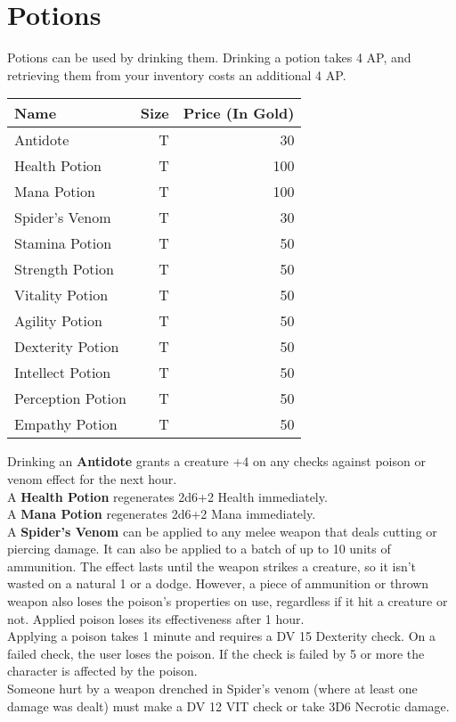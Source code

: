 \section{Potions}
Potions can be used by drinking them. Drinking a potion takes 4 AP, and retrieving them from your inventory costs an additional 4 AP.

\begin{longtable}{l | r | r}
	Name & Size & Price (In Gold)\\ \hline
	Antidote & T & 30\\
	Health Potion & T & 100\\
	Mana Potion & T & 100\\
	Spider's Venom & T & 30\\
	Stamina Potion & T & 50\\
	Strength Potion & T & 50\\
	Vitality Potion & T & 50\\
	Agility Potion & T & 50\\
	Dexterity Potion & T & 50\\
	Intellect Potion & T & 50\\
	Perception Potion & T & 50\\
	Empathy Potion & T & 50\\
\end{longtable}


Drinking an \textbf{Antidote} grants a creature +4 on any checks against poison or venom effect for the next hour.\\

A \textbf{Health Potion} regenerates 2d6+2 Health immediately.\\

A \textbf{Mana Potion} regenerates 2d6+2 Mana immediately.\\

A \textbf{Spider's Venom} can be applied to any melee weapon that deals cutting or piercing damage. It can also be applied to a batch of up to 10 units of ammunition. The effect lasts until the weapon strikes a creature, so it isn't wasted on a natural 1 or a dodge. However, a piece of ammunition or thrown weapon also loses the poison's properties on use, regardless if it hit a creature or not. Applied poison loses its effectiveness after 1 hour.\\
Applying a poison takes 1 minute and requires a DV 15 Dexterity check. On a failed check, the user loses the poison. If the check is failed by 5 or more the character is affected by the poison.\\
Someone hurt by a weapon drenched in Spider's venom (where at least one damage was dealt) must make a DV 12 VIT check or take 3D6 Necrotic damage.\\

